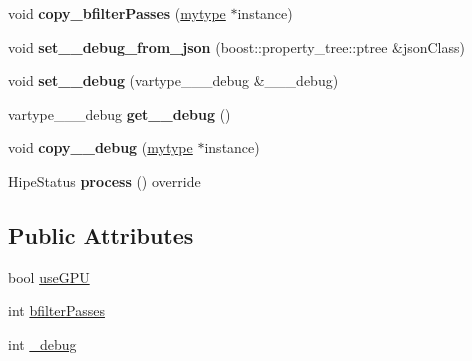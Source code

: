 \begin{DoxyCompactItemize}
\mbox{\label{classfilter_1_1algos_1_1_i_d_plate_cropper_abed5bdc471210863b378dbf17814d163}} 
void {\bfseries copy\+\_\+bfilter\+Passes} (\hyperlink{classfilter_1_1algos_1_1_i_d_plate_cropper}{mytype} $\ast$instance)
\item 
\mbox{\label{classfilter_1_1algos_1_1_i_d_plate_cropper_aa1308114577b67787e62c1e5bbb8c10d}} 
void {\bfseries set\+\_\+\+\_\+debug\+\_\+from\+\_\+json} (boost\+::property\+\_\+tree\+::ptree \&json\+Class)
\item 
\mbox{\label{classfilter_1_1algos_1_1_i_d_plate_cropper_a5d337b622b0f3dbc064938f522b972f2}} 
void {\bfseries set\+\_\+\+\_\+debug} (vartype\+\_\+\+\_\+\+\_\+debug \&\+\_\+\+\_\+\+\_\+debug)
\item 
\mbox{\label{classfilter_1_1algos_1_1_i_d_plate_cropper_a86c4c545ed09652aef9b766607e6a2d6}} 
vartype\+\_\+\+\_\+\+\_\+debug {\bfseries get\+\_\+\+\_\+debug} ()
\item 
\mbox{\label{classfilter_1_1algos_1_1_i_d_plate_cropper_a49b9dd08e4e3a60152fce7884fe3efe5}} 
void {\bfseries copy\+\_\+\+\_\+debug} (\hyperlink{classfilter_1_1algos_1_1_i_d_plate_cropper}{mytype} $\ast$instance)
\item 
\mbox{\label{classfilter_1_1algos_1_1_i_d_plate_cropper_a6e503940fb3fdd2f7cb863cbcf29207e}} 
Hipe\+Status {\bfseries process} () override
\end{DoxyCompactItemize}
\subsection*{Public Attributes}
\begin{DoxyCompactItemize}
\item 
bool \hyperlink{classfilter_1_1algos_1_1_i_d_plate_cropper_a4d72b1833fc13bc45ec68bb523a92195}{use\+G\+PU}
\item 
int \hyperlink{classfilter_1_1algos_1_1_i_d_plate_cropper_af30917d3c48a1911931de5801035da22}{bfilter\+Passes}
\item 
int \hyperlink{classfilter_1_1algos_1_1_i_d_plate_cropper_ad57b87a49b8e57f78559a91a97523e72}{\+\_\+debug}
\end{DoxyCompactItemize}
